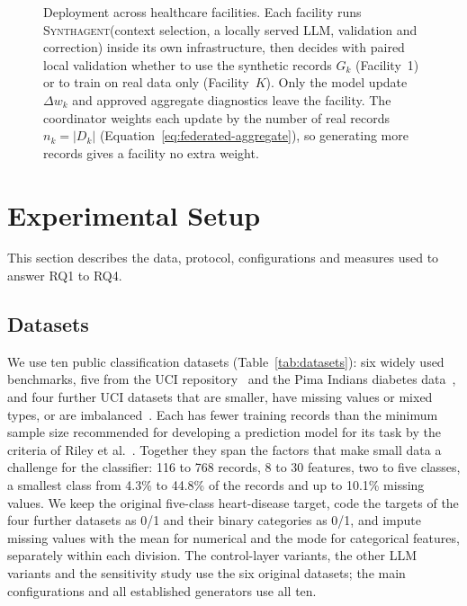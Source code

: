 \documentclass[conference]{IEEEtran}
\newcommand{\system}{\textsc{Synthagent}\xspace}
\begin{document}
\begin{figure}[t]
\centering
\resizebox{\columnwidth}{!}{}
\caption{Deployment across healthcare facilities. Each facility runs \system (context selection, a locally served LLM, validation and correction) inside its own infrastructure, then decides with paired local validation whether to use the synthetic records $G_k$ (Facility~1) or to train on real data only (Facility~$K$). Only the model update $\Delta w_k$ and approved aggregate diagnostics leave the facility. The coordinator weights each update by the number of real records $n_k=|D_k|$ (Equation~\eqref{eq:federated-aggregate}), so generating more records gives a facility no extra weight.}
\label{fig:federated}
\end{figure}


\section{Experimental Setup}
\label{sec:setup}
This section describes the data, protocol, configurations and measures used to answer RQ1 to RQ4.

\subsection{Datasets}
We use ten public classification datasets (Table~\ref{tab:datasets}): six widely used benchmarks, five from the UCI repository~\cite{uciheart,ucibreast,uciheartfailure,uciilpd,uciparkinsons} and the Pima Indians diabetes data~\cite{smith1988diabetes}, and four further UCI datasets that are smaller, have missing values or mixed types, or are imbalanced~\cite{patricio2018coimbra,ucihepatitis,ucickd,zieba2014thoracic}. Each has fewer training records than the minimum sample size recommended for developing a prediction model for its task by the criteria of Riley et al.~\cite{riley2019binary}. Together they span the factors that make small data a challenge for the classifier: 116 to 768 records, 8 to 30 features, two to five classes, a smallest class from 4.3\% to 44.8\% of the records and up to 10.1\% missing values. We keep the original five-class heart-disease target, code the targets of the four further datasets as 0/1 and their binary categories as 0/1, and impute missing values with the mean for numerical and the mode for categorical features, separately within each division. The control-layer variants, the other LLM variants and the sensitivity study use the six original datasets; the main configurations and all established generators use all ten.
\end{document}
